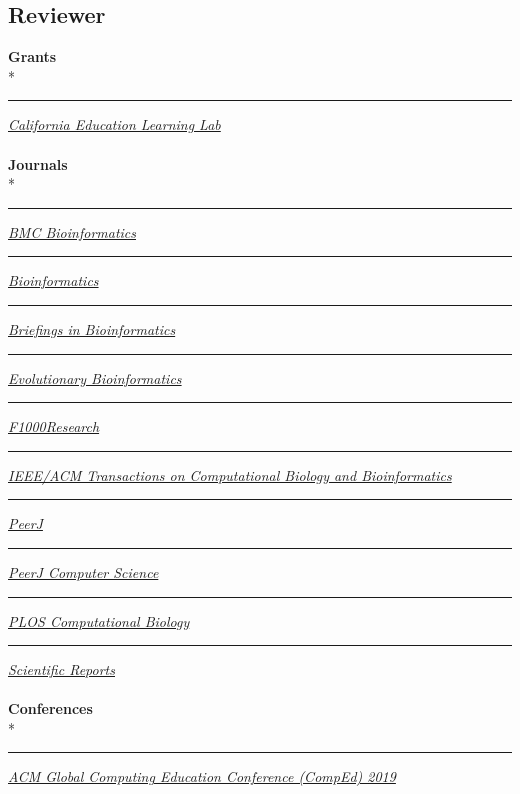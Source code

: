 \documentclass[margin,line]{res}
\begin{document}
\begin{resume}
\section{\sc Reviewer}
\textbf{Grants}\\*
\rule{-1mm}{5mm} \hspace*{4mm} \href{http://opr.ca.gov/learninglab/}{\textit{California Education Learning Lab}}\\
~\\
\textbf{Journals}\\*
\rule{-1mm}{5mm} \hspace*{4mm} \href{https://bmcbioinformatics.biomedcentral.com/}{\textit{BMC Bioinformatics}}\\
\rule{-1mm}{5mm} \hspace*{4mm} \href{https://academic.oup.com/bioinformatics}{\textit{Bioinformatics}}\\
\rule{-1mm}{5mm} \hspace*{4mm} \href{https://academic.oup.com/bib}{\textit{Briefings in Bioinformatics}}\\
\rule{-1mm}{5mm} \hspace*{4mm} \href{https://peerj.com/computer-science/}{\textit{Evolutionary Bioinformatics}}\\
\rule{-1mm}{5mm} \hspace*{4mm} \href{https://f1000research.com}{\textit{F1000Research}}\\
\rule{-1mm}{6mm} \hspace*{4mm} \href{https://ieeexplore.ieee.org/xpl/aboutJournal.jsp?punumber=8857}{\textit{IEEE/ACM Transactions on Computational Biology and Bioinformatics
}}\\
\rule{-1mm}{5mm} \hspace*{4mm} \href{https://peerj.com/}{\textit{PeerJ}}\\
\rule{-1mm}{5mm} \hspace*{4mm} \href{https://peerj.com/computer-science/}{\textit{PeerJ Computer Science}}\\
\rule{-1mm}{5mm} \hspace*{4mm} \href{https://journals.plos.org/ploscompbiol/}{\textit{PLOS Computational Biology}}\\
\rule{-1mm}{5mm} \hspace*{4mm} \href{https://www.nature.com/srep/}{\textit{Scientific Reports}}\\
~\\
\textbf{Conferences}\\*
\rule{-1mm}{5mm} \hspace*{4mm} \href{http://www.acmcomped.org/}{\textit{ACM Global Computing Education Conference (CompEd) 2019}}\\

\end{resume}
\end{document}
